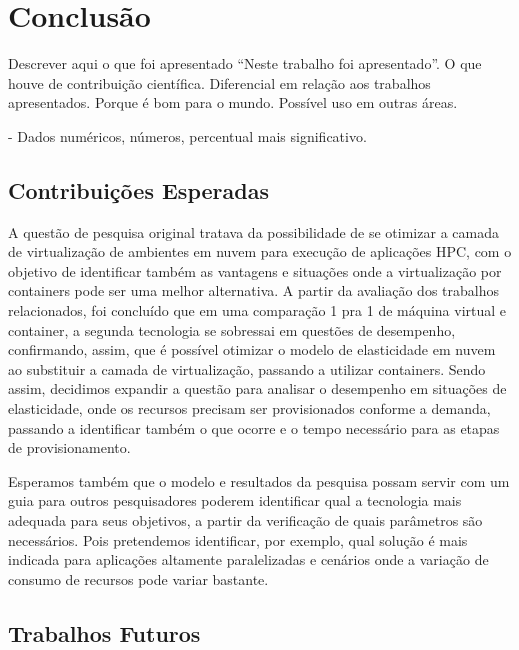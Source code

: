 \documentclass[twoside,english,brazilian]{UNISINOSartigo}
\begin{document}
\chapter{Conclusão}
\label{conclusion}

Descrever aqui o que foi apresentado ``Neste trabalho foi apresentado''. O que houve de contribuição científica.
Diferencial em relação aos trabalhos apresentados. Porque é bom para o mundo.
Possível uso em outras áreas.

- Dados numéricos, números, percentual mais significativo.

\section{Contribuições Esperadas}
\label{contribuicoes}

A questão de pesquisa original tratava da possibilidade de se otimizar a camada de virtualização de ambientes em nuvem para execução de aplicações HPC, com o objetivo de identificar também as vantagens e situações onde a virtualização por containers pode ser uma melhor alternativa. A partir da avaliação dos trabalhos relacionados, foi concluído que em uma comparação 1 pra 1 de máquina virtual e container, a segunda tecnologia se sobressai em questões de desempenho, confirmando, assim, que é possível otimizar o modelo de elasticidade em nuvem ao substituir a camada de virtualização, passando a utilizar containers. Sendo assim, decidimos expandir a questão para analisar o desempenho em situações de elasticidade, onde os recursos precisam ser provisionados conforme a demanda, passando a identificar também o que ocorre e o tempo necessário para as etapas de provisionamento. 

Esperamos também que o modelo e resultados da pesquisa possam servir com um guia para outros pesquisadores poderem identificar qual a tecnologia mais adequada para seus objetivos, a partir da verificação de quais parâmetros são necessários. Pois pretendemos identificar, por exemplo, qual solução é mais indicada para aplicações altamente paralelizadas e cenários onde a variação de consumo de recursos pode variar bastante.

\section{Trabalhos Futuros}
\label{futuros}
\end{document}
